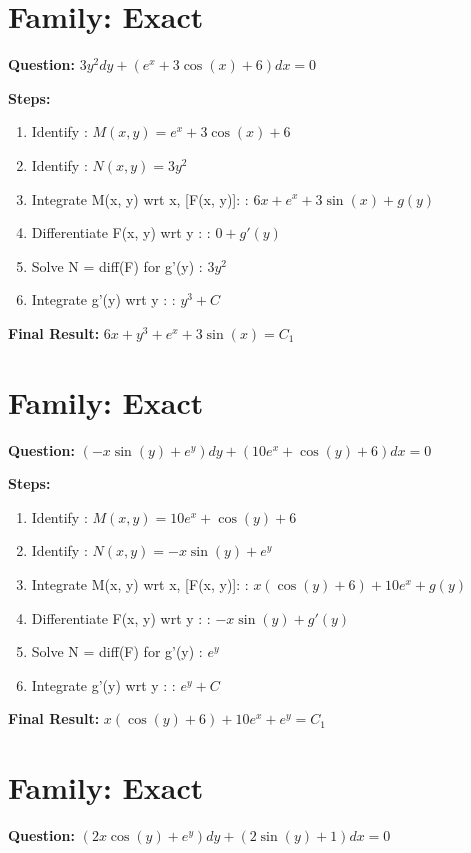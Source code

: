 \documentclass{article}
\begin{document}
\section*{Family: Exact}
\textbf{Question:} $3 y^{2} dy + \left(e^{x} + 3 \cos{\left(x \right)} + 6\right) dx = 0$

\textbf{Steps:}
\begin{enumerate}
\item Identify :  $M(x, y) = e^{x} + 3 \cos{\left(x \right)} + 6$
\item Identify :  $N(x, y) = 3 y^{2}$
\item Integrate M(x, y) wrt x, [F(x, y)]: :  $6 x + e^{x} + 3 \sin{\left(x \right)} + g(y)$
\item Differentiate F(x, y) wrt y :  :  $0 + g'(y)$
\item Solve N = diff(F) for g'(y) :  $3 y^{2}$
\item Integrate g'(y) wrt y :  :  $y^{3} + C$
\end{enumerate}
\textbf{Final Result:} $6 x + y^{3} + e^{x} + 3 \sin{\left(x \right)} = C_{1}$

\section*{Family: Exact}
\textbf{Question:} $\left(- x \sin{\left(y \right)} + e^{y}\right) dy + \left(10 e^{x} + \cos{\left(y \right)} + 6\right) dx = 0$

\textbf{Steps:}
\begin{enumerate}
\item Identify :  $M(x, y) = 10 e^{x} + \cos{\left(y \right)} + 6$
\item Identify :  $N(x, y) = - x \sin{\left(y \right)} + e^{y}$
\item Integrate M(x, y) wrt x, [F(x, y)]: :  $x \left(\cos{\left(y \right)} + 6\right) + 10 e^{x} + g(y)$
\item Differentiate F(x, y) wrt y :  :  $- x \sin{\left(y \right)} + g'(y)$
\item Solve N = diff(F) for g'(y) :  $e^{y}$
\item Integrate g'(y) wrt y :  :  $e^{y} + C$
\end{enumerate}
\textbf{Final Result:} $x \left(\cos{\left(y \right)} + 6\right) + 10 e^{x} + e^{y} = C_{1}$

\section*{Family: Exact}
\textbf{Question:} $\left(2 x \cos{\left(y \right)} + e^{y}\right) dy + \left(2 \sin{\left(y \right)} + 1\right) dx = 0$
\end{document}
